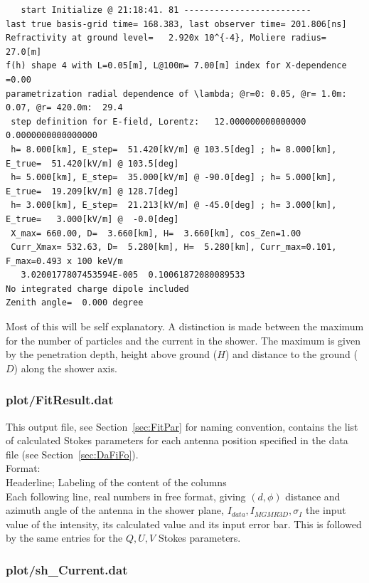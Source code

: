 \documentclass[pdftex,dvipsnames,usenames,fleqn,12pt]{article}
\newcommand*{\secref}[1]{Section~\ref{sec:#1}}
\newcommand*{\seclab}[1]{\label{sec:#1}}
\begin{document}
{\begin{linenumbers}
\begin{verbatim}
   start Initialize @ 21:18:41. 81 -------------------------
last true basis-grid time= 168.383, last observer time= 201.806[ns]
Refractivity at ground level=   2.920x 10^{-4}, Moliere radius=  27.0[m]
f(h) shape 4 with L=0.05[m], L@100m= 7.00[m] index for X-dependence =0.00
parametrization radial dependence of \lambda; @r=0: 0.05, @r= 1.0m: 0.07, @r= 420.0m:  29.4
 step definition for E-field, Lorentz:   12.000000000000000        0.0000000000000000
 h= 8.000[km], E_step=  51.420[kV/m] @ 103.5[deg] ; h= 8.000[km], E_true=  51.420[kV/m] @ 103.5[deg]
 h= 5.000[km], E_step=  35.000[kV/m] @ -90.0[deg] ; h= 5.000[km], E_true=  19.209[kV/m] @ 128.7[deg]
 h= 3.000[km], E_step=  21.213[kV/m] @ -45.0[deg] ; h= 3.000[km], E_true=   3.000[kV/m] @  -0.0[deg]
 X_max= 660.00, D=  3.660[km], H=  3.660[km], cos_Zen=1.00
 Curr_Xmax= 532.63, D=  5.280[km], H=  5.280[km], Curr_max=0.101, F_max=0.493 x 100 keV/m
   3.0200177807453594E-005  0.10061872080089533
No integrated charge dipole included
Zenith angle=  0.000 degree
\end{verbatim}
\end{linenumbers}}

Most of this will be self explanatory. A distinction is made between the maximum for the number of particles and the current in the shower. The maximum is given by the penetration depth, height above ground ($H$) and distance to the ground ($D$) along the shower axis.

\subsubsection{plot/FitResult.dat}\seclab{OutFiRes}

This output file, see \secref{FitPar} for naming convention, contains the list of calculated Stokes parameters for each antenna position specified in the data file (see \secref{DaFiFo}).
\\Format:
\\Headerline; Labeling of the content of the columns
\\Each following line, real numbers in free format, giving $(d,\phi)$ distance and azimuth angle of the antenna in the shower plane, $I_{data}, I_{MGMR3D}, \sigma_I$ the input value of the intensity, its calculated value and its input error bar. This is followed by the same entries for the $Q, U, V$ Stokes parameters.

\subsubsection{plot/sh\_Current.dat}\seclab{ShCur}
\end{document}
